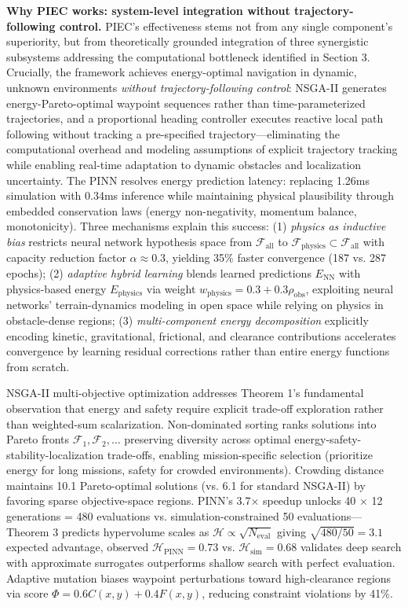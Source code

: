 \documentclass[pdflatex,sn-nature]{sn-jnl}%
\begin{document}
\textbf{Why PIEC works: system-level integration without trajectory-following control.} PIEC's effectiveness stems not from any single component's superiority, but from theoretically grounded integration of three synergistic subsystems addressing the computational bottleneck identified in Section 3. Crucially, the framework achieves energy-optimal navigation in dynamic, unknown environments \emph{without trajectory-following control}: NSGA-II generates energy-Pareto-optimal waypoint sequences rather than time-parameterized trajectories, and a proportional heading controller executes reactive local path following without tracking a pre-specified trajectory—eliminating the computational overhead and modeling assumptions of explicit trajectory tracking while enabling real-time adaptation to dynamic obstacles and localization uncertainty.
 The PINN resolves energy prediction latency: replacing 1.26ms simulation with 0.34ms inference while maintaining physical plausibility through embedded conservation laws (energy non-negativity, momentum balance, monotonicity). Three mechanisms explain this success: (1) \textit{physics as inductive bias} restricts neural network hypothesis space from $\mathcal{F}_{\text{all}}$ to $\mathcal{F}_{\text{physics}} \subset \mathcal{F}_{\text{all}}$ with capacity reduction factor $\alpha \approx 0.3$, yielding 35\% faster convergence (187 vs. 287 epochs); (2) \textit{adaptive hybrid learning} blends learned predictions $E_{\text{NN}}$ with physics-based energy $E_{\text{physics}}$ via weight $w_{\text{physics}} = 0.3 + 0.3\rho_{\text{obs}}$, exploiting neural networks' terrain-dynamics modeling in open space while relying on physics in obstacle-dense regions; (3) \textit{multi-component energy decomposition} explicitly encoding kinetic, gravitational, frictional, and clearance contributions accelerates convergence by learning residual corrections rather than entire energy functions from scratch.

NSGA-II multi-objective optimization addresses Theorem 1's fundamental observation that energy and safety require explicit trade-off exploration rather than weighted-sum scalarization. Non-dominated sorting ranks solutions into Pareto fronts $\mathcal{F}_1, \mathcal{F}_2, \ldots$ preserving diversity across optimal energy-safety-stability-localization trade-offs, enabling mission-specific selection (prioritize energy for long missions, safety for crowded environments). Crowding distance maintains 10.1 Pareto-optimal solutions (vs. 6.1 for standard NSGA-II) by favoring sparse objective-space regions. PINN's 3.7× speedup unlocks 40 × 12 generations = 480 evaluations vs. simulation-constrained 50 evaluations—Theorem 3 predicts hypervolume scales as $\mathcal{H} \propto \sqrt{N_{\text{eval}}}$ giving $\sqrt{480/50} = 3.1$ expected advantage, observed $\mathcal{H}_{\text{PINN}}=0.73$ vs. $\mathcal{H}_{\text{sim}}=0.68$ validates deep search with approximate surrogates outperforms shallow search with perfect evaluation. Adaptive mutation biases waypoint perturbations toward high-clearance regions via score $\Phi = 0.6C(x,y) + 0.4F(x,y)$, reducing constraint violations by 41\%.
\end{document}
